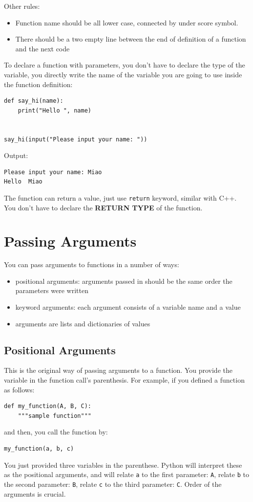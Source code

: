\documentclass[12pt]{book}
\begin{document}
Other rules:
\begin{itemize}
\item Function name should be all lower case, connected by under score symbol.
\item There should be a two empty line between the end of definition of a function and the next code
\end{itemize}

To declare a function with parameters, you don't have to declare the type of the variable, you directly write the name of the variable you are going to use inside the function definition:
\begin{verbatim}
def say_hi(name):
    print("Hello ", name)


say_hi(input("Please input your name: "))
\end{verbatim}
Output:
\begin{verbatim}
Please input your name: Miao
Hello  Miao
\end{verbatim}

The function can return a value, just use \texttt{return} keyword, similar with C++. You don't have to declare the \textbf{RETURN TYPE} of the function.
\section{Passing Arguments}
\label{sec:org88a518f}
You can pass arguments to functions in a number of ways:
\begin{itemize}
\item positional arguments: arguments passed in should be the same order the parameters were written
\item keyword arguments: each argument consists of a variable name and a value
\item arguments are lists and dictionaries of values
\end{itemize}

\subsection{Positional Arguments}
\label{sec:org7f72eb5}
This is the original way of passing arguments to a function. You provide the variable in the function call's parenthesis. For example, if you defined a function as follows:
\begin{verbatim}
def my_function(A, B, C):
    """sample function"""
\end{verbatim}
and then, you call the function by:
\begin{verbatim}
my_function(a, b, c)
\end{verbatim}
You just provided three variables in the parenthese. Python will interpret these as the positional arguments, and will relate \texttt{a} to the first parameter: \texttt{A}, relate \texttt{b} to the second parameter: \texttt{B}, relate \texttt{c} to the third parameter: \texttt{C}. Order of the arguments is crucial.
\end{document}
